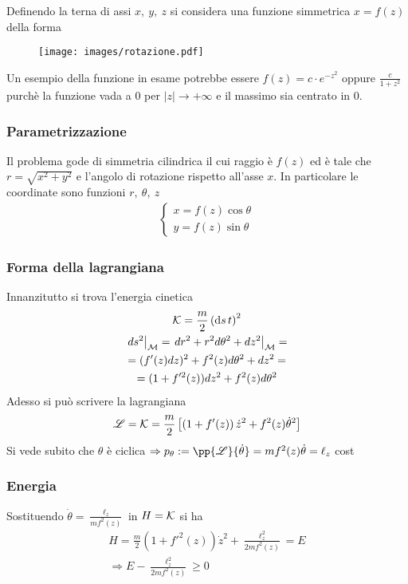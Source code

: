 \documentclass[Main.tex]{subfiles}
\begin{document}
\begin{tema}
Definendo la terna di assi $x, \ y, \ z$ si considera una funzione simmetrica $x=f(z)$ della forma

\begin{figure}[H]
    \centering
  \texttt{[image: images/rotazione.pdf]}
\end{figure}

Un esempio della funzione in esame potrebbe essere $f(z)= c \cdot e^{-z^2}$ oppure $\frac{c}{1+z^2}$ purchè la funzione vada a $0$ per $|z| \rightarrow + \infty$ e il massimo sia centrato in 0. 

\subsubsection*{Parametrizzazione}
Il problema gode di simmetria cilindrica il cui raggio è $f(z)$ ed è tale che $r= \sqrt{x^2+y^2}$ e l'angolo di rotazione rispetto all'asse $x$. In particolare le coordinate sono funzioni $r, \ \theta , \ z$
\begin{gather}
	\begin{cases}
		x= f(z) \cos \theta\\
		y= f(z) \sin \theta 
	\end{cases}
\end{gather}

\subsubsection*{Forma della lagrangiana}
Innanzitutto si trova l'energia cinetica
\begin{gather}
	\mathcal{K} = \frac{m}{2} \left( \dd{s}{t} \right)^2 \\
	\left. ds^2 \right|_{\mathcal{M}} = \left. dr^2 + r^2 d \theta^2 + dz^2 \right|_{\mathcal{M}} =\\
	= (f'(z) dz )^2 + f^2(z) d\theta^2 + dz^2=\\
	=(1+ f'^2(z))dz^2 + f^2 (z) d \theta^2
\end{gather}
Adesso si può scrivere la lagrangiana
\begin{gather}
	\mathscr{L}= \mathcal{K} = \frac{m}{2} \left[ \left( 1+ f'(z) \right) \dot z^2 + f^2(z) \dot \theta^2 \right]
\end{gather}
Si vede subito che $\theta$ è ciclica $\Rightarrow p_\theta:= \pp{\L}{\dot \theta}  = m f^2(z) \dot \theta = \ell_z$ cost

\subsubsection*{Energia }
Sostituendo $\dot \theta = \frac{\ell_z}{m f^2(z)}$ in $H= \mathcal{K}$ si ha 
\begin{gather}
	H= \frac{m}{2} (1+ f'^2(z)) \dot z^2 + \frac{\ell_z^2}{2m f^2(z)} = E\\
	\Rightarrow E- \frac{\ell_z^2}{2m f^2(z)}\geq 0
\end{gather}


\end{tema}
\end{document}
